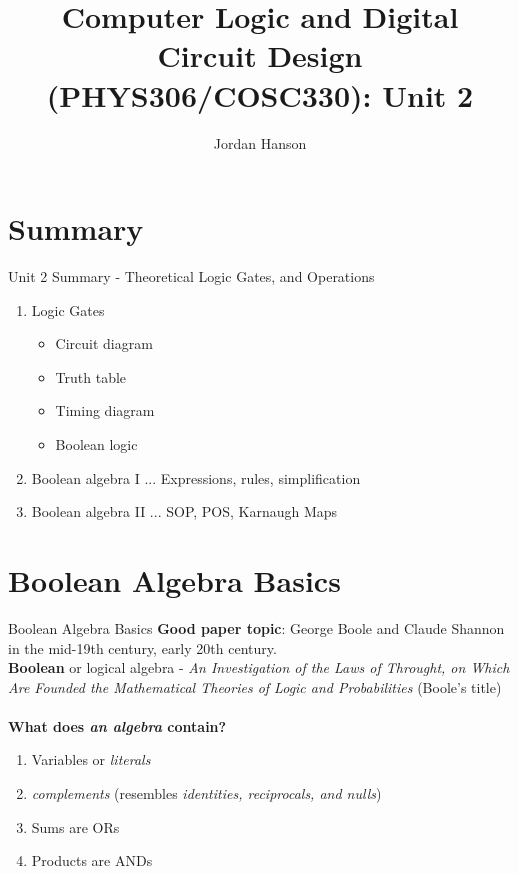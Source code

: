 \documentclass{beamer}
\title{Computer Logic and Digital Circuit Design (PHYS306/COSC330): Unit 2}
\author{Jordan Hanson}
\institute{Whittier College Department of Physics and Astronomy}
\begin{document}
\maketitle

\section{Summary}

\begin{frame}{Unit 2 Summary - Theoretical Logic Gates, and Operations}
\begin{enumerate}
\item Logic Gates
\begin{itemize}
\item Circuit diagram
\item Truth table
\item Timing diagram
\item Boolean logic
\end{itemize}
\item \alert{Boolean algebra I} ... Expressions, rules, simplification
\item \alert{Boolean algebra II} ... SOP, POS, Karnaugh Maps
\end{enumerate}
\end{frame}

\section{Boolean Algebra Basics}

\begin{frame}{Boolean Algebra Basics}
\textbf{Good paper topic}: George Boole and Claude Shannon in the mid-19th century, early 20th century. \\ \vspace{0.5cm}
\textbf{\alert{Boolean}} or logical algebra - \textit{An Investigation of the Laws of Throught, on Which Are Founded the Mathematical Theories of Logic and Probabilities} (Boole's title) \\ \hrulefill \\
\textbf{What does \textit{an algebra} contain?}
\begin{enumerate}
\item Variables or \textit{literals}
\item \textit{complements} (resembles \textit{identities, reciprocals, and nulls})
\item Sums are ORs
\item Products are ANDs
\end{enumerate}
\end{frame}
\end{document}
